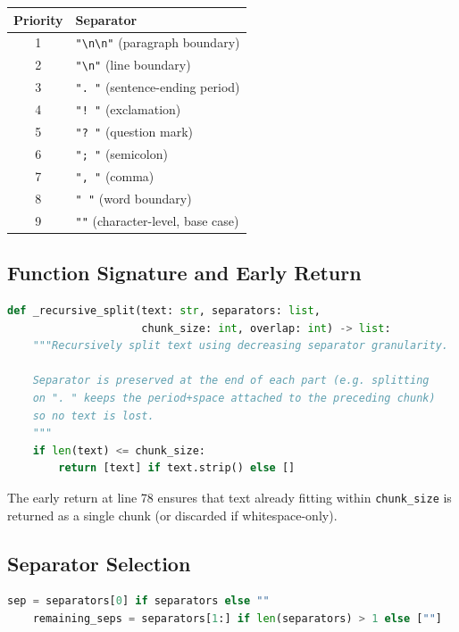 \documentclass[11pt]{article}
\begin{document}
\begin{center}
\begin{tabular}{cl}
\toprule
\textbf{Priority} & \textbf{Separator} \\
\midrule
1 & \verb|"\n\n"| (paragraph boundary) \\
2 & \verb|"\n"| (line boundary) \\
3 & \verb|". "| (sentence-ending period) \\
4 & \verb|"! "| (exclamation) \\
5 & \verb|"? "| (question mark) \\
6 & \verb|"; "| (semicolon) \\
7 & \verb|", "| (comma) \\
8 & \verb|" "| (word boundary) \\
9 & \verb|""| (character-level, base case) \\
\bottomrule
\end{tabular}
\end{center}

\subsection{Function Signature and Early Return}

\begin{lstlisting}[language=Python,caption={\_recursive\_split() --- lines 72--79}]
def _recursive_split(text: str, separators: list,
                     chunk_size: int, overlap: int) -> list:
    """Recursively split text using decreasing separator granularity.

    Separator is preserved at the end of each part (e.g. splitting
    on ". " keeps the period+space attached to the preceding chunk)
    so no text is lost.
    """
    if len(text) <= chunk_size:
        return [text] if text.strip() else []
\end{lstlisting}

The early return at line 78 ensures that text already fitting within
\texttt{chunk\_size} is returned as a single chunk (or discarded if whitespace-only).

\subsection{Separator Selection}

\begin{lstlisting}[language=Python,caption={Separator selection --- lines 81--82}]
    sep = separators[0] if separators else ""
    remaining_seps = separators[1:] if len(separators) > 1 else [""]
\end{lstlisting}
\end{document}

